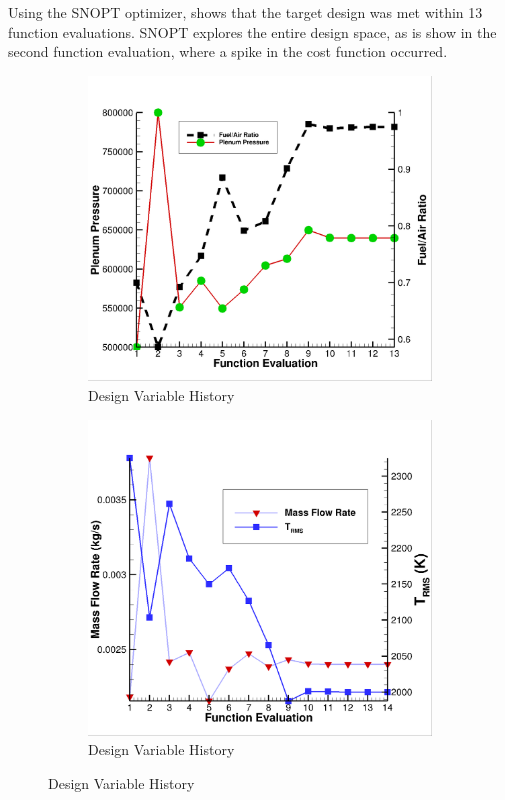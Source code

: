 Using the SNOPT optimizer,  shows that the target
design was met within 13 function evaluations.  SNOPT explores the entire design
space, as is show in the second function evaluation, where a spike in the cost
function occurred.
\begin{figure}[h]
  \centering
	\begin{subfigure}[b]{0.45\textwidth}
    \includegraphics[width=\textwidth]{figures/1st-H2/dv_hist.png}
    \caption{Design Variable History}
    \label{fig:dv-hist-1st-H2}
  \end{subfigure}
	\begin{subfigure}[b]{0.45\textwidth}
    \includegraphics[width=\textwidth]{figures/1st-H2/fm_hist.png}
    \caption{Design Variable History}
    \label{fig:fm-hist-1st-H2}
  \end{subfigure}
\end{figure}
